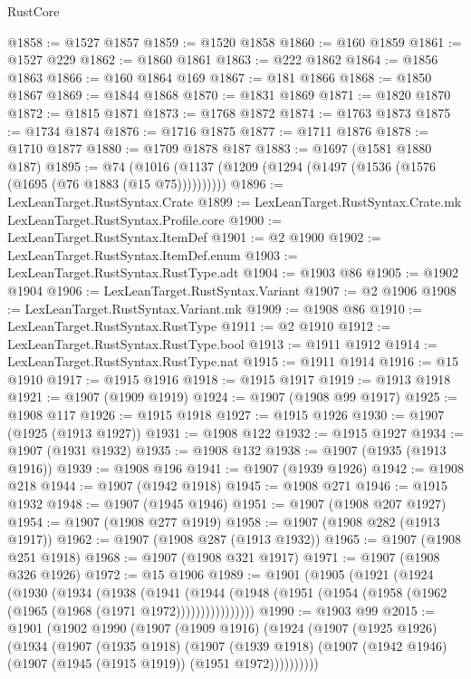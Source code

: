 \begin{lexlean}{RustCore}
\begin{coremodule}
@1858 := @1527 @1857
@1859 := @1520 @1858
@1860 := @160 @1859
@1861 := @1527 @229
@1862 := @1860 @1861
@1863 := @222 @1862
@1864 := @1856 @1863
@1866 := @160 @1864 @169
@1867 := @181 @1866
@1868 := @1850 @1867
@1869 := @1844 @1868
@1870 := @1831 @1869
@1871 := @1820 @1870
@1872 := @1815 @1871
@1873 := @1768 @1872
@1874 := @1763 @1873
@1875 := @1734 @1874
@1876 := @1716 @1875
@1877 := @1711 @1876
@1878 := @1710 @1877
@1880 := @1709 @1878 @187
@1883 := @1697 (@1581 @1880 @187)
@1895 := @74 (@1016 (@1137 (@1209 (@1294 (@1497 (@1536 (@1576 (@1695 (@76 @1883 (@15 @75))))))))))
@1896 := LexLeanTarget.RustSyntax.Crate
@1899 := LexLeanTarget.RustSyntax.Crate.mk LexLeanTarget.RustSyntax.Profile.core
@1900 := LexLeanTarget.RustSyntax.ItemDef
@1901 := @2 @1900
@1902 := LexLeanTarget.RustSyntax.ItemDef.enum
@1903 := LexLeanTarget.RustSyntax.RustType.adt
@1904 := @1903 @86
@1905 := @1902 @1904
@1906 := LexLeanTarget.RustSyntax.Variant
@1907 := @2 @1906
@1908 := LexLeanTarget.RustSyntax.Variant.mk
@1909 := @1908 @86
@1910 := LexLeanTarget.RustSyntax.RustType
@1911 := @2 @1910
@1912 := LexLeanTarget.RustSyntax.RustType.bool
@1913 := @1911 @1912
@1914 := LexLeanTarget.RustSyntax.RustType.nat
@1915 := @1911 @1914
@1916 := @15 @1910
@1917 := @1915 @1916
@1918 := @1915 @1917
@1919 := @1913 @1918
@1921 := @1907 (@1909 @1919)
@1924 := @1907 (@1908 @99 @1917)
@1925 := @1908 @117
@1926 := @1915 @1918
@1927 := @1915 @1926
@1930 := @1907 (@1925 (@1913 @1927))
@1931 := @1908 @122
@1932 := @1915 @1927
@1934 := @1907 (@1931 @1932)
@1935 := @1908 @132
@1938 := @1907 (@1935 (@1913 @1916))
@1939 := @1908 @196
@1941 := @1907 (@1939 @1926)
@1942 := @1908 @218
@1944 := @1907 (@1942 @1918)
@1945 := @1908 @271
@1946 := @1915 @1932
@1948 := @1907 (@1945 @1946)
@1951 := @1907 (@1908 @207 @1927)
@1954 := @1907 (@1908 @277 @1919)
@1958 := @1907 (@1908 @282 (@1913 @1917))
@1962 := @1907 (@1908 @287 (@1913 @1932))
@1965 := @1907 (@1908 @251 @1918)
@1968 := @1907 (@1908 @321 @1917)
@1971 := @1907 (@1908 @326 @1926)
@1972 := @15 @1906
@1989 := @1901
    (@1905
      (@1921
        (@1924
          (@1930
            (@1934
              (@1938
                (@1941
                  (@1944
                    (@1948 (@1951 (@1954 (@1958 (@1962 (@1965 (@1968 (@1971 @1972))))))))))))))))
@1990 := @1903 @99
@2015 := @1901
    (@1902
      @1990
      (@1907
        (@1909 @1916)
        (@1924
          (@1907
            (@1925 @1926)
            (@1934
              (@1907
                (@1935 @1918)
                (@1907
                  (@1939 @1918)
                  (@1907 (@1942 @1946) (@1907 (@1945 (@1915 @1919)) (@1951 @1972))))))))))

\end{coremodule}
\end{lexlean}

